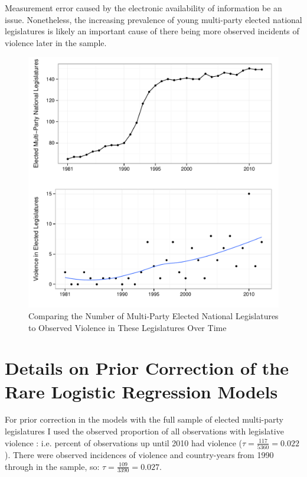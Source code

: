\documentclass[a4paper]{article}\usepackage[]{graphicx}\usepackage[]{color}
\newenvironment{knitrout}{}{} %
\begin{document}
Measurement error caused by the electronic availability of information be an issue. Nonetheless, the increasing prevalence of young multi-party elected national legislatures is likely an important cause of there being more observed incidents of violence later in the sample.

\begin{figure}

    \begin{center}
\begin{knitrout}
\color{fgcolor}
\includegraphics[width=0.8\linewidth]{figure/compareLegToViolence-1} 

\end{knitrout}
    \end{center}

    \caption{Comparing the Number of Multi-Party Elected National Legislatures to Observed Violence in These Legislatures Over Time}
    \label{elect_vs_violence}

\end{figure}


\section*{Details on Prior Correction of the Rare Logistic Regression Models}


For prior correction \citep[see][]{KingRareEventsPA2001} in the models with the full sample of elected multi-party legislatures I used the observed proportion of all observations with legislative violence : i.e.  percent of observations up until 2010 had violence ($\tau = \frac{117}{5360} = 0.022$). There were  observed incidences of violence and  country-years from 1990 through  in the sample, so: $\tau = \frac{109}{3390} = 0.027$.
\end{document}

